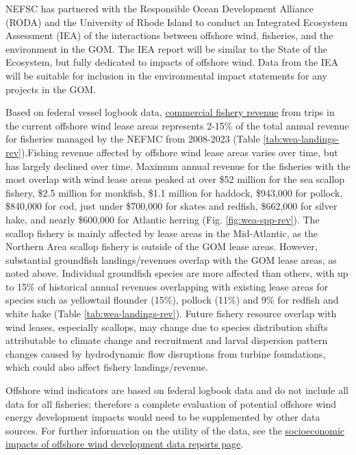 \documentclass[
  10pt,
]{article}
\begin{document}
NEFSC has partnered with the Responsible Ocean Development Alliance (RODA) and the University of Rhode Island to conduct an Integrated Ecosystem Assessment (IEA) of the interactions between offshore wind, fisheries, and the environment in the GOM. The IEA report will be similar to the State of the Ecosystem, but fully dedicated to impacts of offshore wind. Data from the IEA will be suitable for inclusion in the environmental impact statements for any projects in the GOM.

Based on federal vessel logbook data, \href{https://noaa-edab.github.io/catalog/wind_revenue.html}{commercial fishery revenue} from trips in the current offshore wind lease areas represents 2-15\% of the total annual revenue for fisheries managed by the NEFMC from 2008-2023 (Table \ref{tab:wea-landings-rev}).Fishing revenue affected by offshore wind lease areas varies over time, but has largely declined over time. Maximum annual revenue for the fisheries with the most overlap with wind lease areas peaked at over \$52 million for the sea scallop fishery, \$2.5 million for monkfish, \$1.1 million for haddock, \$943,000 for pollock, \$840,000 for cod, just under \$700,000 for skates and redfish, \$662,000 for silver hake, and nearly \$600,000 for Atlantic herring (Fig. \ref{fig:wea-spp-rev}). The scallop fishery is mainly affected by lease areas in the Mid-Atlantic, as the Northern Area scallop fishery is outside of the GOM lease areas. However, substantial groundfish landings/revenues overlap with the GOM lease areas, as noted above. Individual groundfish species are more affected than others, with up to 15\% of historical annual revenues overlapping with existing lease areas for species such as yellowtail flounder (15\%), pollock (11\%) and 9\% for redfish and white hake (Table \ref{tab:wea-landings-rev}). Future fishery resource overlap with wind leases, especially scallops, may change due to species distribution shifts attributable to climate change and recruitment and larval dispersion pattern changes caused by hydrodynamic flow disruptions from turbine foundations, which could also affect fishery landings/revenue.

Offshore wind indicators are based on federal logbook data and do not include all data for all fisheries; therefore a complete evaluation of potential offshore wind energy development impacts would need to be supplemented by other data sources. For further information on the utility of the data, see the \href{https://www.fisheries.noaa.gov/resource/data/socioeconomic-impacts-atlantic-offshore-wind-development}{socioeconomic impacts of offshore wind development data reports page}.
\end{document}
